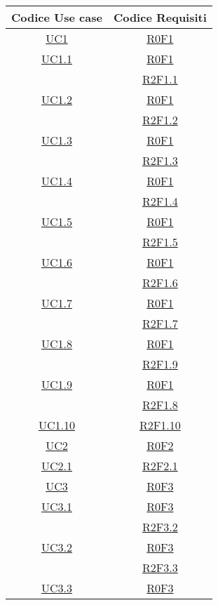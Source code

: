 \clearpage
\normalsize
\begin{longtable}{|c|c|}
\hline
\textbf{Codice Use case} & \textbf{Codice Requisiti} \\
\hline
\endhead
\hyperlink{UC1}{UC1} & \hyperlink{R0F1}{R0F1}\\
\hline
\hyperlink{UC1.1}{UC1.1} & \hyperlink{R0F1}{R0F1}\\
& \hyperlink{R2F1.1}{R2F1.1}\\
\hline
\hyperlink{UC1.2}{UC1.2} & \hyperlink{R0F1}{R0F1}\\
& \hyperlink{R2F1.2}{R2F1.2}\\
\hline
\hyperlink{UC1.3}{UC1.3} & \hyperlink{R0F1}{R0F1}\\
& \hyperlink{R2F1.3}{R2F1.3}\\
\hline
\hyperlink{UC1.4}{UC1.4} & \hyperlink{R0F1}{R0F1}\\
& \hyperlink{R2F1.4}{R2F1.4}\\
\hline
\hyperlink{UC1.5}{UC1.5} & \hyperlink{R0F1}{R0F1}\\
& \hyperlink{R2F1.5}{R2F1.5}\\
\hline
\hyperlink{UC1.6}{UC1.6} & \hyperlink{R0F1}{R0F1}\\
& \hyperlink{R2F1.6}{R2F1.6}\\
\hline
\hyperlink{UC1.7}{UC1.7} & \hyperlink{R0F1}{R0F1}\\
& \hyperlink{R2F1.7}{R2F1.7}\\
\hline
\hyperlink{UC1.8}{UC1.8} & \hyperlink{R0F1}{R0F1}\\
& \hyperlink{R2F1.9}{R2F1.9}\\
\hline
\hyperlink{UC1.9}{UC1.9} & \hyperlink{R0F1}{R0F1}\\
& \hyperlink{R2F1.8}{R2F1.8}\\
\hline
\hyperlink{UC1.10}{UC1.10} & \hyperlink{R2F1.10}{R2F1.10}\\
\hline
\hyperlink{UC2}{UC2} & \hyperlink{R0F2}{R0F2}\\
\hline
\hyperlink{UC2.1}{UC2.1} & \hyperlink{R2F2.1}{R2F2.1}\\
\hline
\hyperlink{UC3}{UC3} & \hyperlink{R0F3}{R0F3}\\
\hline
\hyperlink{UC3.1}{UC3.1} & \hyperlink{R0F3}{R0F3}\\
& \hyperlink{R2F3.2}{R2F3.2}\\
\hline
\hyperlink{UC3.2}{UC3.2} & \hyperlink{R0F3}{R0F3}\\
& \hyperlink{R2F3.3}{R2F3.3}\\
\hline
\hyperlink{UC3.3}{UC3.3} & \hyperlink{R0F3}{R0F3}\\

\end{longtable}
